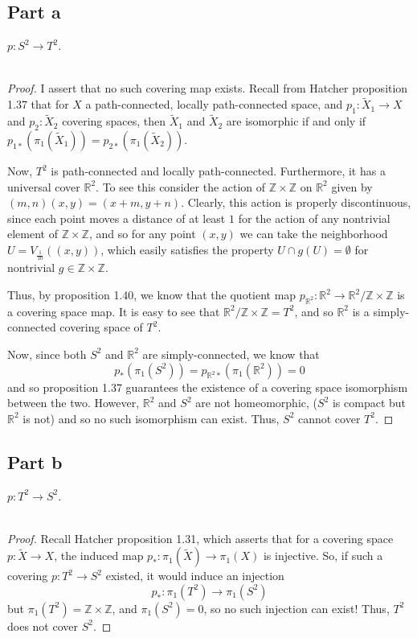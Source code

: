 \documentclass[fontsize=11pt]{scrartcl} %
\numberwithin{equation}{section} %
\numberwithin{figure}{section} %
\numberwithin{table}{section} %
\newcommand{\R}{\mathbb{R}}
\newcommand{\Z}{\mathbb{Z}}
\begin{document}
\subsection*{Part a}
$p:S^2\to T^2$.
\\
\\
\begin{proof}
    I assert that no such covering map exists. Recall from Hatcher proposition
    1.37 that for $X$ a path-connected, locally path-connected space, and
    $p_1:\tilde{X}_1\to X$ and $p_2:\tilde{X}_2$ covering spaces, then
    $\tilde{X}_1$ and $\tilde{X}_2$ are isomorphic if and only if
    $p_{1*}(\pi_1(\tilde{X}_1)) = p_{2*}(\pi_1(\tilde{X}_2))$.

    Now, $T^2$ is path-connected and locally path-connected. Furthermore, it has
    a universal cover $\R^2$. To see this consider the action of $\Z\times \Z$
    on $\R^2$ given by $(m,n)(x,y) = (x+m,y+n)$. Clearly, this action is
    properly discontinuous, since each point moves a distance of at least $1$
    for the action of any nontrivial element of $\Z\times \Z$, and so for any
    point $(x,y)$ we can take the neighborhood $U= V_{\frac{1}{10}}((x,y))$, which
    easily satisfies the property $U\cap g(U) = \emptyset$ for nontrivial $g\in
    \Z\times\Z$.

    Thus, by proposition 1.40, we know that the quotient map $p_{\R^2}:\R^2\to
    \R^2/{\Z\times\Z}$ is a covering space map. It is easy to see that
    $\R^2/{\Z\times\Z} = T^2$, and so $\R^2$ is a simply-connected covering
    space of $T^2$.

    Now, since both $S^2$ and $\R^2$ are simply-connected, we know that
    \[
        p_*(\pi_1(S^2)) = p_{\R^2*}(\pi_1(\R^2)) = 0
    \]
    and so proposition 1.37 guarantees the existence of a covering space
    isomorphism between the two. However, $\R^2$ and $S^2$ are not homeomorphic,
    ($S^2$ is compact but $\R^2$ is not) and so no such isomorphism can exist.
    Thus, $S^2$ cannot cover $T^2$.
    
\end{proof}

\subsection*{Part b}
$p:T^2\to S^2$.
\\
\\
\begin{proof}
    Recall Hatcher proposition 1.31, which asserts that for a covering space
    $p:\tilde{X}\to X$, the induced map $p_*:\pi_1(\tilde{X})\to\pi_1(X)$ is
    injective. So, if such a covering $p:T^2\to S^2$ existed, it would induce an
    injection
    \[
        p_*:\pi_1(T^2)\to\pi_1(S^2)
    \]
    but $\pi_1(T^2) = \Z\times\Z$, and $\pi_1(S^2)=0$, so no such injection can
    exist! Thus, $T^2$ does not cover $S^2$.
\end{proof}
\end{document}
